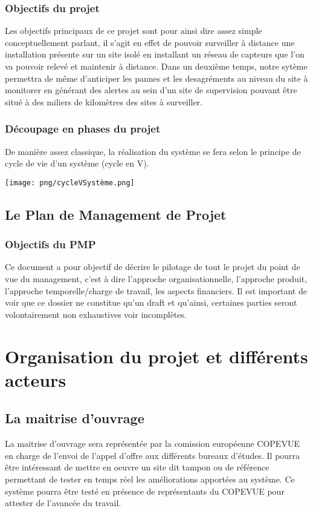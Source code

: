 \subsubsection{Objectifs du projet}
Les objectifs principaux de ce projet sont pour ainsi dire assez simple conceptuellement parlant, il s'agit en effet de pouvoir surveiller à distance une installation présente sur un site isolé en installant un réseau de capteurs que l'on va pouvoir relevé et maintenir à distance. Dans un deuxième temps, notre sytème permettra de même d'anticiper les pannes et les desagréments au niveau du site à monitorer en générant des alertes au sein d'un site de supervision pouvant être situé à des miliers de kilomètres des sites à surveiller.

\subsubsection{Découpage en phases du projet}
De manière assez classique, la réalisation du système se fera selon le principe de cycle de vie d'un système (cycle en V).
\begin {center}
\texttt{[image: png/cycleVSystème.png]}
\end {center}

\subsection{Le Plan de Management de Projet}
\subsubsection{Objectifs du PMP}
Ce document a pour objectif de décrire le pilotage de  tout le projet du point de vue du management, c'est à dire l'approche organisationnelle, l'approche produit, l'approche temporelle/charge de travail, les aspects financiers. Il est important de voir que ce dossier ne constitue qu'un draft et qu'ainsi, certaines parties seront volontairement non exhaustives voir incomplètes.

\section{Organisation du projet et différents acteurs}
\subsection{La maitrise d'ouvrage}
La maitrise d'ouvrage sera représentée par la comission européenne COPEVUE en charge de l'envoi de l'appel d'offre aux différents bureaux d'études. Il pourra être intéressant de mettre en oeuvre un site dit tampon ou de référence permettant de tester en temps réel les améliorations apportées au système. Ce système pourra être testé en présence de représentants du COPEVUE pour attester de l'avancée du travail. 
